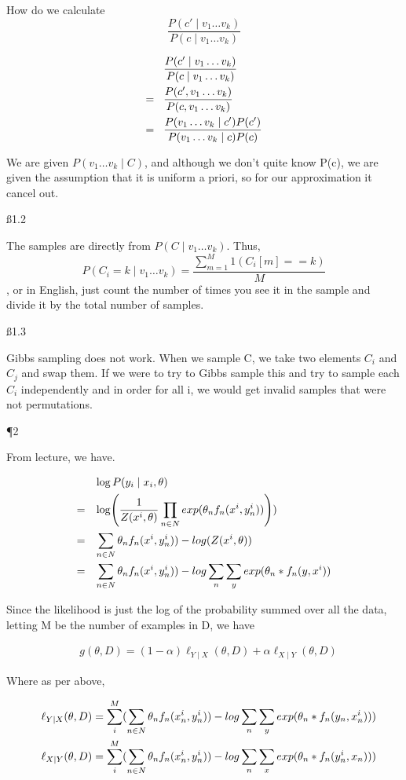 How do we calculate \[
\frac{P(c' \mid v_1 \dots v_k)}{P(c \mid v_1 \dots v_k)}
\]

\begin{align*}
& \frac{P(c' \mid v_1 \dots v_k)}{P(c \mid v_1 \dots v_k)} \nl
\frac{P(c', v_1 \dots v_k)}{P(c, v_1 \dots v_k)} \nl
\frac{P(v_1 \dots v_k \mid c') P(c')}{P(v_1 \dots v_k \mid c) P(c)}
\end{align*}

We are given $P(v_1 \dots v_k \mid C)$, and although we don't quite know P(c), we are given the assumption that it is uniform a priori, so for our approximation it cancel out.

\ss {1.2}

The samples are directly from $P(C \mid v_1 \dots v_k)$. Thus,
\[P(C_i = k \mid v_1 \dots v_k) = \frac{\sum_{m=1}^M 1(C_i[m]==k)}{M}
\], or in English, just count the number of times you see it in the sample and divide it by the total number of samples.

\ss {1.3}

Gibbs sampling does not work. When we sample C, we take two elements $C_i$ and $C_j$ and swap them. If we were to try to Gibbs sample this and try to sample each $C_i$ independently and in order for all i, we would get invalid samples that were not permutations.

\P 2

From lecture, we have.

\begin{align*}
& \log P(y_i \mid x_i, \theta) \nl \log(\frac{1}{Z(x^i, \theta)} \prod_{n \in N} exp(\theta_n f_n(x^i,y_n^i)))) \nl
\sum_{n \in N} \theta_n f_n(x^i,y_n^i)) - log(Z(x^i, \theta)) \nl
\sum_{n \in N} \theta_n f_n(x^i,y_n^i)) - log \sum_n \sum_y exp(\theta_n * f_n(y,x^i))
\end{align*}

Since the likelihood is just the log of the probability summed over all the data, letting M be the number of examples in D, we have

\begin{align*}
& g(\theta, D) = (1-\alpha)\ell_{Y \mid X}(\theta, D) + \alpha\ell_{X \mid Y}(\theta,D)
\end{align*}

Where as per above,

\begin{align*}
&\ell_{Y \mid X}(\theta, D) = \sum_i^M (\sum_{n \in N} \theta_n f_n(x_n^i,y_n^i)) - log \sum_n \sum_y exp(\theta_n * f_n(y_n,x_n^i))) \\ \sp &
\ell_{X \mid Y}(\theta, D) = \sum_i^M (\sum_{n \in N} \theta_n f_n(x_n^i,y_n^i)) - log \sum_n \sum_x exp(\theta_n * f_n(y_n^i,x_n)))
\end{align*}

